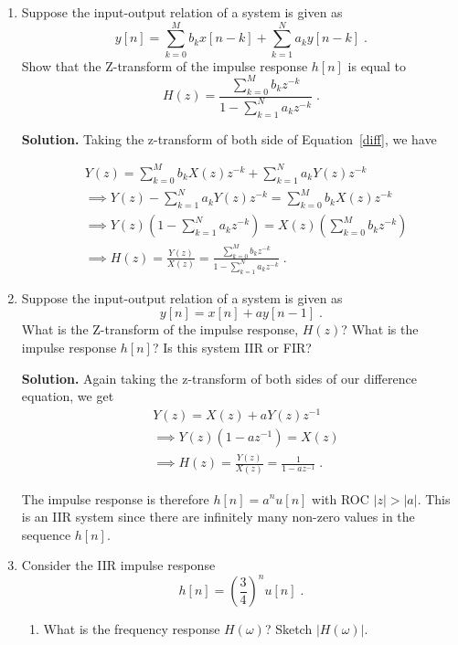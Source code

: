 \documentclass[]{siamltex}
\begin{document}
\begin{enumerate}

\item Suppose the input-output relation of a system is given as 
\begin{equation}
y[n] = \sum_{k=0}^M b_k x[n-k] + \sum_{k=1}^N a_k y[n-k]\;.\label{diff}
\end{equation} Show that the Z-transform of the impulse response $h[n]$ is equal to $$H(z) = \frac{\sum_{k=0}^M b_k z^{-k}}{1-\sum_{k=1}^N a_k z^{-k}}\;.$$

\textbf{Solution.} Taking the z-transform of both side of Equation~\ref{diff}, we have

\begin{align*}
&Y(z) = \sum_{k=0}^M b_k X(z) z^{-k} + \sum_{k=1}^N a_k Y(z) z^{-k} \\
&\implies Y(z) - \sum_{k=1}^N a_k Y(z) z^{-k}= \sum_{k=0}^M b_k X(z) z^{-k}  \\
&\implies Y(z) \left( 1 - \sum_{k=1}^N a_k z^{-k} \right)= X(z) \left( \sum_{k=0}^M b_k z^{-k}  \right)\\
&\implies H(z) = \frac{Y(z)}{X(z)} =  \frac{\sum_{k=0}^M b_k z^{-k}}{ 1 - \sum_{k=1}^N a_k z^{-k} } \;.
\end{align*}

\newpage
\item Suppose the input-output relation of a system is given as $$y[n] = x[n] + a y[n-1]\;.$$ What is the Z-transform of the impulse response, $H(z)$? What is the impulse response $h[n]$? Is this system IIR or FIR?

\vspace{5mm}
\textbf{Solution.} Again taking the z-transform of both sides of our difference equation, we get
\begin{align*}
&Y(z) = X(z) + a Y(z) z^{-1} \\
&\implies Y(z) (1-a z^{-1}) = X(z) \\
&\implies H(z) = \frac{Y(z)}{X(z)} = \frac{1}{1-a z^{-1}}\;.
\end{align*}

The impulse response is therefore $h[n] = a^n u[n]$ with ROC $|z|>|a|$. This is an IIR system since there are infinitely many non-zero values in the sequence $h[n]$. 

\vspace{5mm}
\item Consider the IIR impulse response $$h[n] = \left(\frac{3}{4}\right)^n u[n]\;.$$ 

\vspace{3mm}
\begin{enumerate}
\item What is the frequency response $H(\omega)$? Sketch $|H(\omega)|$.


\end{enumerate}
\end{enumerate}
\end{document}
